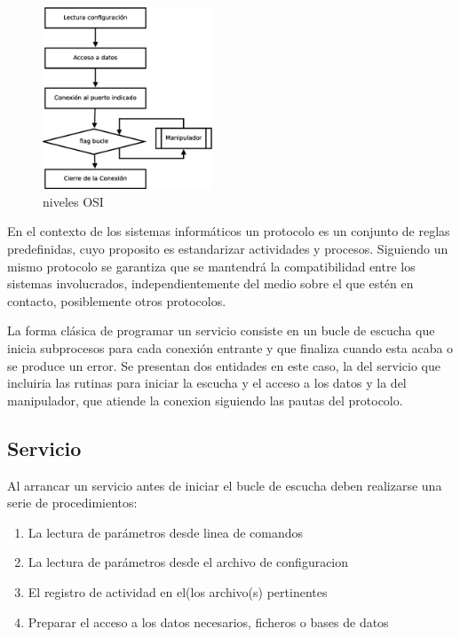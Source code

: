 \documentclass[a4paper,spanish,12pt]{book}
\begin{document}
\begin{figure}
	\includegraphics[width=0.45\textwidth]{img/FlujoServicio.eps}
              \caption{niveles OSI}
  \label{fig:nivelesOSI}
\end{figure}

En el contexto de los sistemas informáticos un protocolo es un conjunto de reglas predefinidas, cuyo proposito es estandarizar actividades y procesos. Siguiendo un mismo protocolo se garantiza que se mantendrá la compatibilidad entre los sistemas involucrados, independientemente del medio sobre el que est\'en en contacto, posiblemente otros protocolos.

La forma cl\'asica de programar un servicio consiste en un bucle de escucha que inicia subprocesos para cada conexi\'on entrante y que finaliza cuando esta acaba o se produce un error. Se presentan dos entidades en este caso, la del servicio que incluiria las rutinas para iniciar la escucha y el acceso a los datos y la del manipulador, que atiende la conexion siguiendo las pautas del protocolo.

\subsection{Servicio}

Al arrancar un servicio antes de iniciar el bucle de escucha deben realizarse una serie de procedimientos:
\begin{enumerate}
	\item La lectura de parámetros desde linea de comandos
	\item La lectura de parámetros desde el archivo de configuracion
	\item El registro de actividad en el(los archivo(s) pertinentes
	\item Preparar el acceso a los datos necesarios, ficheros o bases de datos
\end{enumerate}
\end{document}
